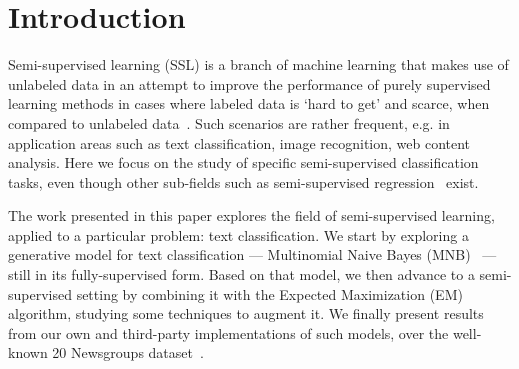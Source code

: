 \section{Introduction}
\label{sec:intro}

Semi-supervised learning (SSL) is a branch of machine learning that makes use of 
unlabeled data in an attempt to improve the performance of purely supervised 
learning methods in cases where labeled data is `hard to get' and scarce, when compared to 
unlabeled data~\cite{chapelle2010semi,zhu05survey,zhu2009introduction}. Such scenarios are 
rather frequent, e.g. in application areas such as text classification, image 
recognition, web content analysis. Here we focus on 
the study of specific semi-supervised classification tasks, even though other 
sub-fields such as semi-supervised regression~\cite{chapelle2010semi} 
exist.\vertbreak

The work presented in this paper explores the field of semi-supervised learning, 
applied to a particular problem: text classification. We start by exploring 
a generative model for text classification --- Multinomial Naive Bayes (MNB)~\cite{McCallum98acomparison} --- still 
in its fully-supervised form. Based on that model, we then advance to a 
semi-supervised setting by combining it with the Expected Maximization (EM)~\cite{Nigam2000} 
algorithm, studying some techniques to augment it. We finally present results 
from our own and third-party implementations of such models, over the 
well-known 20 Newsgroups dataset~\cite{Lang95}.
